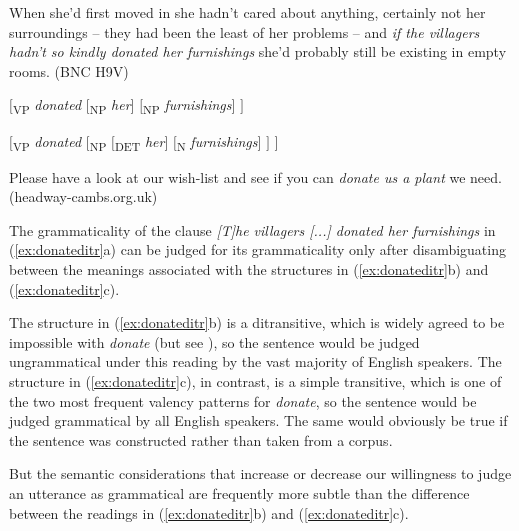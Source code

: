 \begin{exe}
\ex
\begin{xlist}
\label{ex:donateditr}

\ex When she'd first moved in she hadn't cared about anything, certainly not her surroundings -- they had been the least of her problems -- and \textit{if the villagers hadn't so kindly donated her furnishings} she'd probably still be existing in empty rooms. (BNC H9V)

\ex $[$\textsubscript{VP} \textit{donated }$[$\textsubscript{NP} \textit{her}$]$ $[$\textsubscript{NP} \textit{furnishings}$]$ $]$

\ex $[$\textsubscript{VP} \textit{donated }$[$\textsubscript{NP} $[$\textsubscript{DET }\textit{her}$]$ $[$\textsubscript{N} \textit{furnishings}$]$ $]$ $]$

\ex Please have a look at our wish\hyp{}list and see if you can \textit{donate us a plant} we need. (headway-cambs.org.uk)

\end{xlist}
\end{exe}

The grammaticality  of the clause \textit{[T]he villagers [...] donated her furnishings} in (\ref{ex:donateditr}a) can be judged for its grammaticality only after disambiguating between the meanings associated with the structures in (\ref{ex:donateditr}b) and (\ref{ex:donateditr}c).

The structure in (\ref{ex:donateditr}b) is a ditransitive,  which is widely agreed to be impossible with \textit{donate} (but see \citealt{stefanowitsch_linguistics_2007}), so the sentence would be judged ungrammatical  under this reading by the vast majority of English speakers. The structure in (\ref{ex:donateditr}c), in contrast, is a simple transitive,  which is one of the two most frequent valency  patterns for \textit{donate}, so the sentence would be judged grammatical by all English speakers. The same would obviously be true if the sentence was constructed rather than taken from a corpus.

But the semantic  considerations that increase or decrease our willingness to judge an utterance as grammatical are frequently more subtle than the difference between the readings in (\ref{ex:donateditr}b) and (\ref{ex:donateditr}c).

